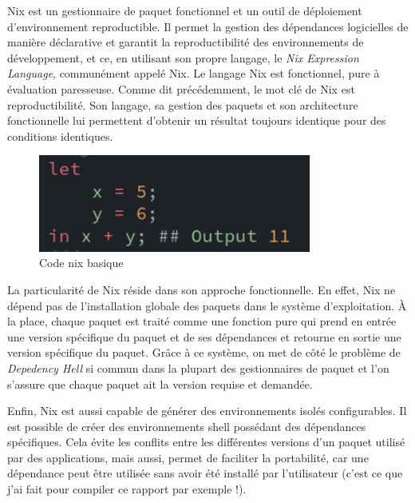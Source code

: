 \documentclass[a4paper,french,12pt, titlepage]{article}
\begin{document}
Nix est un gestionnaire de paquet fonctionnel et un outil de déploiement
d'environnement reproductible. Il permet la gestion des dépendances
logicielles de manière déclarative et garantit la reproductibilité des
environnements de développement, et ce, en utilisant son propre langage,
le \emph{Nix Expression Language}, communément appelé Nix. Le langage
Nix est fonctionnel, pure à évaluation paresseuse. Comme dit
précédemment, le mot clé de Nix est reproductibilité. Son langage, sa
gestion des paquets et son architecture fonctionnelle lui permettent
d'obtenir un résultat toujours identique pour des conditions
identiques.\newline

\begin{figure}[h]
\centering
\includegraphics[width=0.8\textwidth,height=0.8\textheight,keepaspectratio]{images/codebasenixdark.png}
\caption{Code nix basique}
\end{figure}

La particularité de Nix réside dans son approche fonctionnelle. En
effet, Nix ne dépend pas de l'installation globale des paquets dans le
système d'exploitation. À la place, chaque paquet est traité comme une
fonction pure qui prend en entrée une version spécifique du paquet et de
ses dépendances et retourne en sortie une version spécifique du paquet.
Grâce à ce système, on met de côté le problème de \emph{Depedency Hell}
si commun dans la plupart des gestionnaires de paquet et l'on s'assure
que chaque paquet ait la version requise et demandée.\newline

Enfin, Nix est aussi capable de générer des environnements isolés
configurables. Il est possible de créer des environnements shell
possédant des dépendances spécifiques. Cela évite les conflits entre les
différentes versions d'un paquet utilisé par des applications, mais
aussi, permet de faciliter la portabilité, car une dépendance peut être
utilisée sans avoir été installé par l'utilisateur (c'est ce que j'ai
fait pour compiler ce rapport par exemple !).\newline
\end{document}

